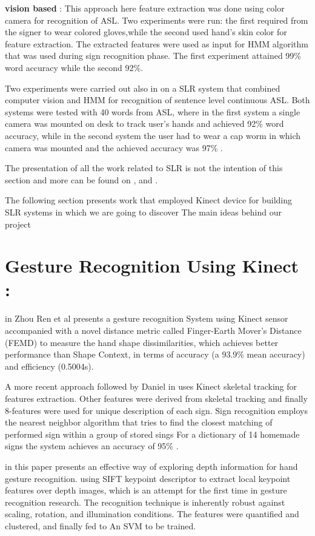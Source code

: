 \textbf{vision based }:
This approach  \cite{32} here  feature extraction was done using color camera for recognition of ASL. Two experiments were run: the first required from the signer to wear colored gloves,while the second used hand’s skin color for feature extraction\cite{32}. The extracted features were used as input for HMM algorithm that was used during sign recognition phase. The first experiment attained 99\% word accuracy while the second 92\%.
 
Two experiments were carried out also in \cite{33} on a SLR system that combined computer vision and HMM for recognition of sentence level continuous ASL. Both systems were tested with 40 words from ASL, where in the first system a single camera was mounted on desk to track user’s hands and achieved 92\% word accuracy, while in the second system the user had to wear a cap worm in which camera was mounted and the achieved accuracy was 97\%  \cite{33}.



The presentation of all the work related to SLR is not the intention of this section and more can be found on  \cite{27},\cite{36} and \cite{39}. 

The following section presents work that employed Kinect device for building SLR systems in which we are going to discover The main ideas behind our project 

\section{Gesture Recognition Using Kinect :}

in \cite{35} Zhou Ren et al presents a gesture recognition System using Kinect sensor accompanied with a novel distance metric called Finger-Earth Mover’s Distance (FEMD) to measure the hand shape dissimilarities, which achieves better performance than Shape Context, in terms of accuracy (a 93.9\% mean accuracy) and efficiency (0.5004s). 

A more recent approach followed by Daniel in \cite{47} uses Kinect skeletal tracking for features extraction. Other features were derived from skeletal tracking and finally 8-features were used for unique description of each sign. Sign recognition employs the nearest neighbor algorithm that tries to find the closest matching of performed sign within a group of stored sings  For a dictionary of 14 homemade signs the system achieves an accuracy of 95\% \cite{47}. 

in \cite{dardas} this paper presents an effective way of exploring depth information for hand gesture recognition. using  SIFT keypoint descriptor to extract local keypoint features over depth images,  which is an attempt for the first time in gesture recognition research. The recognition technique is inherently robust against scaling, rotation, and illumination conditions.  The features were  quantified  and clustered, and finally fed to  An SVM to be trained.\\


